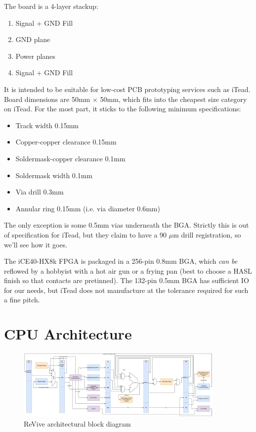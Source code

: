 \documentclass{article}
\begin{document}
The board is a 4-layer stackup:

\begin{enumerate}
\item Signal + GND Fill
\item GND plane
\item Power planes
\item Signal + GND Fill
\end{enumerate}

It is intended to be suitable for low-cost PCB prototyping services such as iTead. Board dimensions are 50mm $\times$ 50mm, which fits into the cheapest size category on iTead. For the most part, it sticks to the following minimum specifications:

\begin{itemize}
\item Track width 0.15mm
\item Copper-copper clearance 0.15mm
\item Soldermask-copper clearance 0.1mm
\item Soldermask width 0.1mm
\item Via drill 0.3mm
\item Annular ring 0.15mm (i.e. via diameter 0.6mm)
\end{itemize}

The only exception is some 0.5mm vias underneath the BGA. Strictly this is out of specification for iTead, but they claim to have a 90 $\mu$m drill registration, so we'll see how it goes.

The iCE40-HX8k FPGA is packaged in a 256-pin 0.8mm BGA, which \textit{can be} reflowed by a hobbyist with a hot air gun or a frying pan (best to choose a HASL finish so that contacts are pretinned). The 132-pin 0.5mm BGA has sufficient IO for our needs, but iTead does not manufacture at the tolerance required for such a fine pitch.


\section{CPU Architecture}

\begin{figure}
\caption{ReVive architectural block diagram}
\centering
\includegraphics[width=0.9\textwidth]{diagrams/cpu_full.pdf}
\end{figure}
\end{document}
